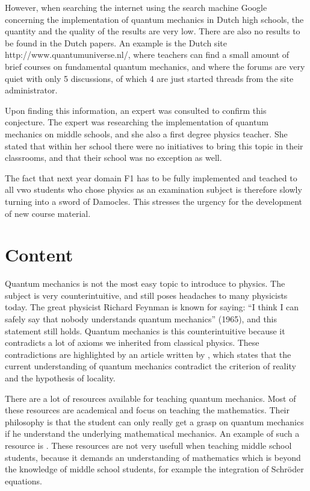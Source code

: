 \documentclass[12pt]{report} %
\begin{document}
However, when searching the internet using the search machine Google concerning the implementation of quantum mechanics in Dutch high schools, the quantity and the quality of the results are very low. There are also no results to be found in the Dutch papers. An example is the Dutch site http://www.quantumuniverse.nl/, where teachers can find a small amount of brief courses on fundamental quantum mechanics, and where the forums are very quiet with only 5 discussions, of which 4 are just started threads from the site administrator.

Upon finding this information, an expert was consulted to confirm this conjecture. The expert was researching the implementation of quantum mechanics on middle schools, and she also a first degree physics teacher. She stated that within her school there were no initiatives to bring this topic in their classrooms, and that their school was no exception as well.

The fact that next year domain F1 has to be fully implemented and teached to all vwo students who chose physics as an examination subject is therefore slowly turning into a sword of Damocles. This stresses the urgency for the development of new course material.

\section{Content}

Quantum mechanics is not the most easy topic to introduce to physics. The subject is very counterintuitive, and still poses headaches to many physicists today. The great physicist Richard Feynman is known for saying: “I think I can safely say that nobody understands quantum mechanics” (1965), and this statement still holds. Quantum mechanics is this counterintuitive because it contradicts a lot of axioms we inherited from classical physics. These contradictions are highlighted by an article written by , which states that the current understanding of quantum mechanics contradict the criterion of reality and the hypothesis of locality.

There are a lot of resources available for teaching quantum mechanics. Most of these resources are academical and focus on teaching the mathematics. Their philosophy is that the student can only really get a grasp on quantum mechanics if he understand the underlying mathematical mechanics. An example of such a resource is . These resources are not very usefull when teaching middle school students, because it demands an understanding of mathematics which is beyond the knowledge of middle school students, for example the integration of Schröder equations.
\end{document}
